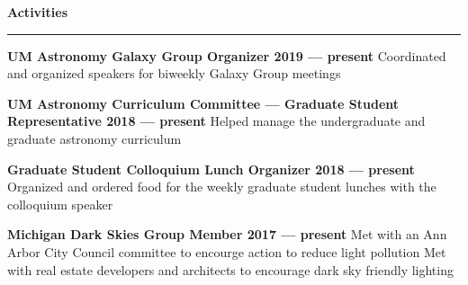 \documentclass[10pt]{article}
\newcommand{\header}[1]{\vspace{2em}\par \textbf{\large #1}\strut\hrule\vspace{0em}}
\newcommand{\actionHeader}[2]{\textbf{#1 \hfill #2}}
\newcommand{\indentedItem}[1]{\newline\null\qquad #1}
\begin{document}
\header{Activities}

\actionHeader{UM Astronomy Galaxy Group Organizer}{2019 --- present}
\indentedItem{Coordinated and organized speakers for biweekly Galaxy Group meetings}

\actionHeader{UM Astronomy Curriculum Committee --- Graduate Student Representative}{2018 --- present}
\indentedItem{Helped manage the undergraduate and graduate astronomy curriculum}

\actionHeader{Graduate Student Colloquium Lunch Organizer}{2018 --- present}
\indentedItem{Organized and ordered food for the weekly graduate student lunches with the colloquium speaker}

\actionHeader{Michigan Dark Skies Group Member}{2017 --- present}
\indentedItem{Met with an Ann Arbor City Council committee to encourge action to reduce light pollution}
\indentedItem{Met with real estate developers and architects to encourage dark sky friendly lighting}




\end{document}
